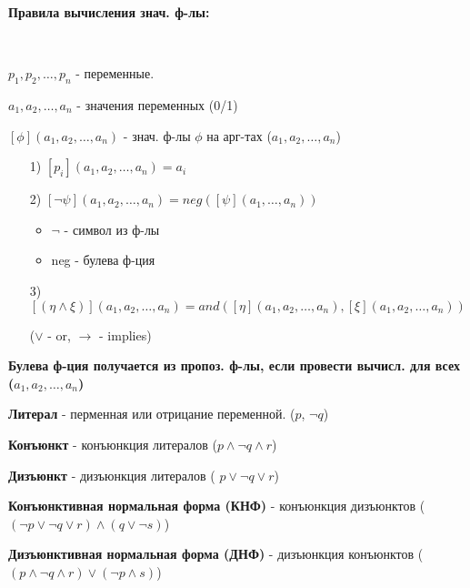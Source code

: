 \textbf{Правила вычисления знач. ф-лы:}
\begin{symb}
~\newline

    $p_1, p_2, \ldots , p_n$ - переменные.

    $a_1, a_2, \ldots, a_n$ - значения переменных (0/1)

    $[\phi](a_1, a_2, \ldots, a_n)$ - знач. ф-лы $\phi$ на арг-тах ($a_1, a_2, \ldots, a_n$)
\end{symb}
\begin{definition}
\begin{enumerate}
    \item [1) ] $[p_i](a_1, a_2, \ldots, a_n) = a_i$
    \item [2) ] $[\neg \psi](a_1, a_2, \ldots, a_n) = neg([\psi](a_1, \ldots , a_n))$
        \begin{itemize}
            \item $\neg$ - символ из ф-лы
            \item neg - булева ф-ция
        \end{itemize}
    \item [3) ] $[(\eta \land \xi)](a_1, a_2, \ldots, a_n) = and([\eta](a_1, a_2, \ldots, a_n), [\xi](a_1, a_2, \ldots, a_n))$ 

        ($\lor$ - or, $\rightarrow$ - implies)

\end{enumerate}
\textbf{Булева ф-ция получается из пропоз. ф-лы, если провести вычисл. для всех ($a_1, a_2, \ldots, a_n$)}
\end{definition}
\begin{definition}
\textbf{Литерал} - перменная или отрицание переменной. ($p$, $\neg q$)
\end{definition}
\begin{definition}
  \textbf{Конъюнкт} - конъюнкция литералов ($p \land \neg q \land r$)
\end{definition}
\begin{definition}
    \textbf{Дизъюнкт} - дизъюнкция литералов ( $p \lor \neg q \lor r$)
\end{definition}
\begin{definition}
    \textbf{Конъюнктивная нормальная форма (КНФ)} - конъюнкция дизъюнктов ($(\neg p \lor \neg q \lor r) \land (q \lor \neg s)$)
\end{definition}
\begin{definition}
    \textbf{Дизъюнктивная нормальная форма (ДНФ)} - дизъюнкция конъюнктов ($(p \land \neg q \land r) \lor (\neg p \land s)$)
\end{definition}
